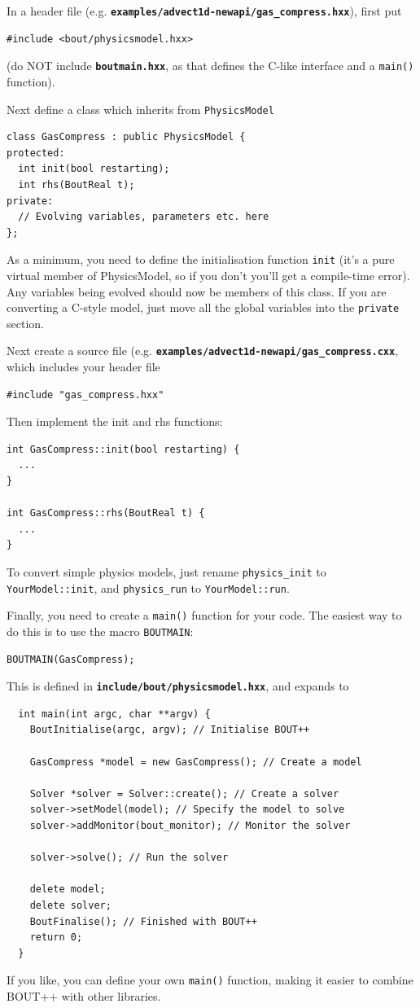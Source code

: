 \documentclass[12pt]{article}
\newcommand{\file}[1]{\texttt{\bf #1}}
\begin{document}
In a header file (e.g. \file{examples/advect1d-newapi/gas\_compress.hxx}), first put
\begin{lstlisting}
#include <bout/physicsmodel.hxx>
\end{lstlisting}
(do NOT include \file{boutmain.hxx}, as that defines the C-like interface and a \lstinline!main()! function).

Next define a class which inherits from \lstinline!PhysicsModel!
\begin{lstlisting}
class GasCompress : public PhysicsModel {
protected:
  int init(bool restarting);
  int rhs(BoutReal t);
private:
  // Evolving variables, parameters etc. here
};
\end{lstlisting}
As a minimum, you need to define the initialisation function \lstinline!init! (it's a pure virtual
member of PhysicsModel, so if you don't you'll get a compile-time error). Any variables being evolved
should now be members of this class. If you are converting a C-style model, just move all the global variables into the \lstinline!private! section.

Next create a source file (e.g. \file{examples/advect1d-newapi/gas\_compress.cxx}, which
includes your header file
\begin{lstlisting}
#include "gas_compress.hxx"
\end{lstlisting}

Then implement the init and rhs functions:
\begin{lstlisting}
int GasCompress::init(bool restarting) {
  ...
}

int GasCompress::rhs(BoutReal t) {
  ...
}
\end{lstlisting}
To convert simple physics models, just rename \lstinline!physics_init! to \lstinline!YourModel::init!,
and \lstinline!physics_run! to \lstinline!YourModel::run!.

Finally, you need to create a \lstinline!main()! function for your code. The easiest way to do this
is to use the macro \lstinline!BOUTMAIN!:
\begin{lstlisting}
BOUTMAIN(GasCompress);
\end{lstlisting}
This is defined in \file{include/bout/physicsmodel.hxx}, and expands to
\begin{lstlisting}
  int main(int argc, char **argv) {
    BoutInitialise(argc, argv); // Initialise BOUT++

    GasCompress *model = new GasCompress(); // Create a model

    Solver *solver = Solver::create(); // Create a solver
    solver->setModel(model); // Specify the model to solve
    solver->addMonitor(bout_monitor); // Monitor the solver

    solver->solve(); // Run the solver

    delete model;
    delete solver;
    BoutFinalise(); // Finished with BOUT++
    return 0;
  }
\end{lstlisting}
If you like, you can define your own \lstinline!main()! function, making it easier to combine
BOUT++ with other libraries.
\end{document}
